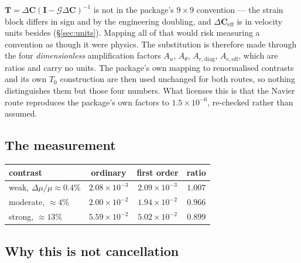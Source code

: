 \documentclass[11pt,a4paper]{article}
\newcommand{\dC}{\Delta\mathbf{C}}
\newcommand{\dCeff}{\Delta\mathbf{C}_{\mathrm{eff}}}
\begin{document}
$\mathbf{T} = \dC(\mathbf{I}-\mathcal{G}\dC)^{-1}$ is not in the package's
$9\times9$ convention --- the strain block differs in sign and by the engineering
doubling, and $\dCeff$ is in velocity units besides (\S\ref{sec:units}).  Mapping
all of that would risk measuring a convention as though it were physics.  The
substitution is therefore made through the four \emph{dimensionless}
amplification factors $A_u$, $A_\theta$, $A_{e,\mathrm{diag}}$,
$A_{e,\mathrm{off}}$, which are ratios and carry no units.  The package's own
mapping to renormalised contrasts and its own $T_0$ construction are then used
unchanged for both routes, so nothing distinguishes them but those four numbers.
What licenses this is that the Navier route reproduces the package's own factors
to $1.5\times10^{-6}$, re-checked rather than assumed.

\subsection{The measurement}

\begin{center}
\begin{tabular}{lccc}
\toprule
contrast & ordinary & first order & ratio\\
\midrule
weak, $\Delta\mu/\mu \approx 0.4\%$   & $2.08\times10^{-3}$ & $2.09\times10^{-3}$ & $1.007$\\
moderate, $\approx 4\%$               & $2.00\times10^{-2}$ & $1.94\times10^{-2}$ & $0.966$\\
strong, $\approx 13\%$                & $5.59\times10^{-2}$ & $5.02\times10^{-2}$ & $0.899$\\
\bottomrule
\end{tabular}
\end{center}

\subsection{Why this is not cancellation}
\end{document}
